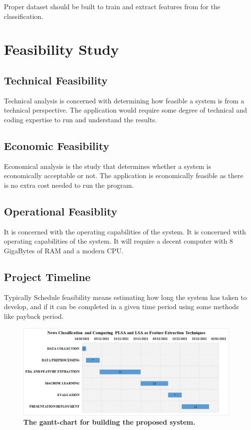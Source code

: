 \documentclass[12pt]{report}
\begin{document}
                    Proper dataset should be built to train and extract features from for the classification.

        \section{Feasibility Study}

            \subsection{Technical Feasibility}

            Technical analysis is concerned with determining how feasible a system is from a technical
perspective.
                The application would require some degree of technical and coding expertise to run and understand the results.

            \subsection{Economic Feasibility}
            Economical analysis is the study that determines whether a system is economically acceptable or
not.
                The application is economically feasible as there is no extra cost needed to run the program.
            \subsection{Operational Feasiblity}
            It is concerned with the operating capabilities of the system.
                It is concerned with operating capabilities of the system. It will require a decent computer with 8 GigaBytes of RAM and a modern CPU.


        \subsection{Project Timeline}
        Typically Schedule feasibility means estimating how long the system has taken to develop, and if
it can be completed in a given time period using some methods like payback period.
                \begin{figure}[h!]
                    \includegraphics[scale=0.45]{gantt1.png}
                    \caption{\textbf{The gantt-chart for building the proposed system.}}
                \end{figure}
\end{document}
